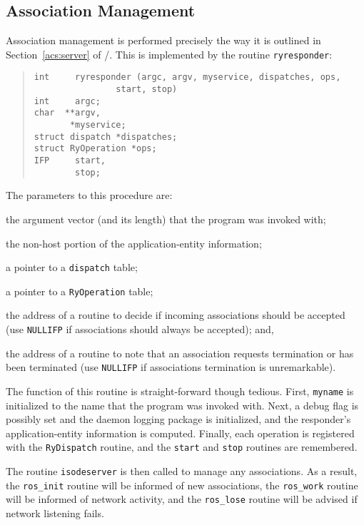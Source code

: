 \subsection	{Association Management}
Association management is performed precisely the way it is outlined in
Section~\ref{acs:server} of \volone/.
This is implemented by the routine \verb"ryresponder":
\begin{quote}\small\begin{verbatim}
int     ryresponder (argc, argv, myservice, dispatches, ops,
                start, stop)
int     argc;
char  **argv,
       *myservice;
struct dispatch *dispatches;
struct RyOperation *ops;
IFP     start,
        stop;
\end{verbatim}\end{quote}
The parameters to this procedure are:
\begin{describe}
\item[\verb"argc"/\verb"argv":] the argument vector (and its length)
that the program was invoked with;

\item[\verb"myservice":] the non-host portion of the application-entity
information;

\item[\verb"dispatches":] a pointer to a \verb"dispatch" table;

\item[\verb"ops":] a pointer to a \verb"RyOperation" table;

\item[\verb"start":] the address of a routine to decide if incoming
associations should be accepted
(use \verb"NULLIFP" if associations should always be accepted);
and,

\item[\verb"stop":] the address of a routine to note that an association
requests termination or has been terminated
(use \verb"NULLIFP" if associations termination is unremarkable).
\end{describe}
The function of this routine is straight-forward though tedious.
First, \verb"myname" is initialized to the name that the program was invoked
with.
Next, a debug flag is possibly set and the daemon logging package is
initialized,
and the responder's application-entity information is computed.
Finally,
each operation is registered with the \verb"RyDispatch" routine,
and the \verb"start" and \verb"stop" routines are remembered.

The routine \verb"isodeserver" is then called to manage any associations.
As a result,
the \verb"ros_init" routine will be informed of new associations,
the \verb"ros_work" routine will be informed of network activity,
and the \verb"ros_lose" routine will be advised if network listening fails.

